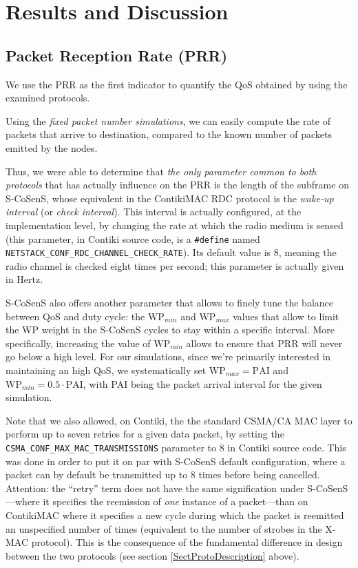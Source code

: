 \documentclass[conference]{IEEEtran}
\begin{document}
\section{Results and Discussion}

\subsection{Packet Reception Rate (PRR)}

We use the PRR as the first indicator to quantify the QoS obtained by
using the examined protocols.

Using the \emph{fixed packet number simulations}, we can easily compute the
rate of packets that arrive to destination, compared to the known number
of packets emitted by the nodes.

Thus, we were able to determine that \emph{the only parameter common to
both protocols} that has actually influence on the PRR is the length of
the subframe on S-CoSenS, whose equivalent in the ContikiMAC RDC protocol
is the \emph{wake-up interval} (or \emph{check interval}). This interval
is actually configured, at the implementation level, by changing the rate
at which the radio medium is sensed (this parameter, in Contiki source code,
is a \texttt{\#define} named
\texttt{NETSTACK\_CONF\_RDC\_CHANNEL\_CHECK\_RATE}).
Its default value is 8, meaning the radio channel is checked eight times
per second; this parameter is actually given in Hertz.

S-CoSenS also offers another parameter that allows to finely tune the
balance between QoS and duty cycle: the $\mathrm{WP}_{min}$ and
$\mathrm{WP}_{max}$ values that allow to limit the WP weight in the
S-CoSenS cycles to stay within a specific interval. More specifically,
increasing the value of $\mathrm{WP}_{min}$ allows to ensure that PRR
will never go below a high level. For our simulations, since we're
primarily interested in maintaining an high QoS, we systematically
set $\mathrm{WP}_{max} = \mathrm{PAI}$ and $\mathrm{WP}_{min}
= 0.5 \cdot \mathrm{PAI}$, with PAI being the packet arrival
interval for the given simulation.

Note that we also allowed, on Contiki, the the standard CSMA/CA MAC layer
to perform up to seven retries for a given data packet, by setting the
\texttt{CSMA\_CONF\_MAX\_MAC\_TRANSMISSIONS}
parameter to 8 in Contiki source code. This was done in order to put it
on par with S-CoSenS default configuration, where a packet can by default
be transmitted up to 8 times before being cancelled.
Attention: the ``retry'' term does not have the same signification
under S-CoSenS---where it specifies the reemission of \emph{one} instance of
a packet---than on ContikiMAC where it specifies a new cycle during
which the packet is reemitted an unspecified number of times (equivalent
to the number of strobes in the X-MAC protocol). This is the consequence
of the fundamental difference in design between the two protocols
(see section \ref{SectProtoDescription} above).
\end{document}
